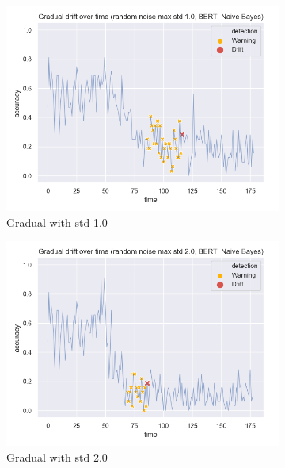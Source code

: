 \documentclass[12pt]{extreport}
\begin{document}
\begin{figure}[H]
\centering
\begin{subfigure}{.5\textwidth}
  \centering
  \includegraphics[width=\linewidth]{assets/detecting-change/gradual_noise_random_std_1_nb_wos_1_BERT.png}
  \caption{Gradual with std 1.0}
  \label{fig:nb-gradual-std-1}
\end{subfigure}%
\begin{subfigure}{.5\textwidth}
  \centering
  \includegraphics[width=\linewidth]{assets/detecting-change/gradual_noise_random_std_2_nb_wos_1_BERT.png}
  \caption{Gradual with std 2.0}
  \label{fig:nb-gradual-std-2}
\end{subfigure}
\begin{subfigure}{.5\textwidth}

\end{subfigure}
\end{figure}
\end{document}
